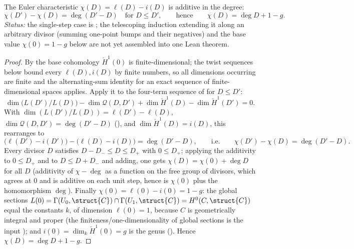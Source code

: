 \begin{theorem}
[\(\chi\)-KEYSTONE: \(\chi(D) = \deg D + 1 - g\)]
  \label{thm:adelic_chi_eq_chi_zero_add_degree}
  The Euler characteristic \(\chi(D) = \ell(D) - i(D)\) is additive in the
  degree:
  \[
    \chi(D') - \chi(D) = \deg(D' - D)
    \quad\text{for } D \le D',
    \qquad\text{hence}\qquad
    \chi(D) = \deg D + 1 - g .
  \]
  \emph{Status:} the single-step case is
  ; the telescoping induction extending
  it along an arbitrary divisor (summing one-point bumps and their
  negatives) and the base value \(\chi(0) = 1 - g\) below are not yet
  assembled into one Lean theorem.
\end{theorem}
\begin{proof}
  By  the base cohomology
  \(\check{H}^1(0)\) is finite-dimensional; the twist sequences below
  bound every \(\ell(D), i(D)\) by finite numbers, so all dimensions
  occurring are finite and the alternating-sum identity for an exact
  sequence of finite-dimensional spaces applies. Apply it to the
  four-term sequence of  for
  \(D \le D'\):
  \[
    \dim\!\bigl(L(D')/L(D)\bigr) - \dim \mathcal{Q}(D, D')
      + \dim \check{H}^1(D) - \dim \check{H}^1(D') = 0 .
  \]
  With \(\dim(L(D')/L(D)) = \ell(D') - \ell(D)\),
  \(\dim \mathcal{Q}(D, D') = \deg(D' - D)\)
  (), and
  \(\dim \check{H}^1(D) = i(D)\), this rearranges to
  \[
    \bigl(\ell(D') - i(D')\bigr) - \bigl(\ell(D) - i(D)\bigr)
      = \deg(D' - D),
    \qquad\text{i.e.}\qquad \chi(D') - \chi(D) = \deg(D' - D).
  \]
  Every divisor \(D\) satisfies \(D - D_- \le D \le D_+\) with
  \(0 \le D_+\); applying the additivity to \(0 \le D_+\) and to
  \(D \le D + D_-\) and adding, one gets \(\chi(D) = \chi(0) + \deg D\)
  for all \(D\) (additivity of \(\chi - \deg\) as a function on the free
  group of divisors, which agrees at \(0\) and is additive on each unit
  step, hence is \(\chi(0)\) plus the homomorphism \(\deg\)). Finally
  \(\chi(0) = \ell(0) - i(0) = 1 - g\): the global sections
  \(L(0) = \Gamma(U_0, \struct{C}) \cap \Gamma(U_1, \struct{C}) =
  H^0(C, \struct{C})\) equal the constants \(k\), of dimension
  \(\ell(0) = 1\), because \(C\) is geometrically integral and proper
  (the finiteness/one-dimensionality of global sections is the input
  ); and
  \(i(0) = \dim_k \check{H}^1(0) = g\) is the genus
  (). Hence
  \(\chi(D) = \deg D + 1 - g\).
\end{proof}

